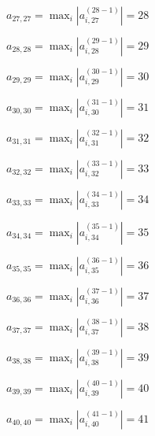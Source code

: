 \documentclass[a4paper,12pt]{article}
\begin{document}
$a _{ 27, 27 } =  \max _i |a _{ i, 27 } ^{ (28 - 1) } | = 28$

$a _{ 28, 28 } =  \max _i |a _{ i, 28 } ^{ (29 - 1) } | = 29$

$a _{ 29, 29 } =  \max _i |a _{ i, 29 } ^{ (30 - 1) } | = 30$

$a _{ 30, 30 } =  \max _i |a _{ i, 30 } ^{ (31 - 1) } | = 31$

$a _{ 31, 31 } =  \max _i |a _{ i, 31 } ^{ (32 - 1) } | = 32$

$a _{ 32, 32 } =  \max _i |a _{ i, 32 } ^{ (33 - 1) } | = 33$

$a _{ 33, 33 } =  \max _i |a _{ i, 33 } ^{ (34 - 1) } | = 34$

$a _{ 34, 34 } =  \max _i |a _{ i, 34 } ^{ (35 - 1) } | = 35$

$a _{ 35, 35 } =  \max _i |a _{ i, 35 } ^{ (36 - 1) } | = 36$

$a _{ 36, 36 } =  \max _i |a _{ i, 36 } ^{ (37 - 1) } | = 37$

$a _{ 37, 37 } =  \max _i |a _{ i, 37 } ^{ (38 - 1) } | = 38$

$a _{ 38, 38 } =  \max _i |a _{ i, 38 } ^{ (39 - 1) } | = 39$

$a _{ 39, 39 } =  \max _i |a _{ i, 39 } ^{ (40 - 1) } | = 40$

$a _{ 40, 40 } =  \max _i |a _{ i, 40 } ^{ (41 - 1) } | = 41$
\end{document}
